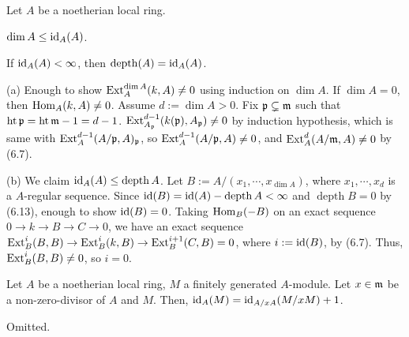 \documentclass{../../../small}
\newcommand{\depth}{\operatorname{depth}}
\newcommand{\hgt}{\operatorname{ht}}
\begin{document}
\begin{thm*}[6.12]
Let $A$ be a noetherian local ring.
\begin{parts}
\item $\dim A\le\operatorname{id}_A(A)$.
\item If $\operatorname{id}_A(A)<\infty$, then $\depth(A)=\id_A(A)$.
\end{parts}
\end{thm*}

\begin{pf}
(a)
Enough to show $\operatorname{Ext}_A^{\dim A}(k,A)\ne0$ using induction on $\dim A$.
If $\dim A=0$, then $\operatorname{Hom}_A(k,A)\ne0$.
Assume $d:=\dim A>0$.
Fix $\mathfrak{p}\subsetneq\mathfrak{m}$ such that $\hgt\fp=\hgt\fm-1=d-1$.
$\operatorname{Ext}_{A_{\mathfrak{p}}}^{d-1}(k(\mathfrak{p}),A_{\mathfrak{p}})\ne0$ by induction hypothesis, which is same with $\operatorname{Ext}_A^{d-1}(A/\mathfrak{p},A)_{\mathfrak{p}}$, so $\operatorname{Ext}_A^{d-1}(A/\mathfrak{p},A)\ne0$, and $\operatorname{Ext}_A^d(A/\mathfrak{m},A)\ne0$ by (6.7).


(b)
We claim $\id_A(A)\le\depth A$.
Let $B:=A/(x_1,\cdots,x_{\dim A})$, where $x_1,\cdots,x_d$ is a $A$-regular sequence.
Since $\id(B)=\id(A)-\depth A<\infty$ and $\depth B=0$ by (6.13), enough to show $\operatorname{id}(B)=0$.
Taking $\operatorname{Hom}_B(-B)$ on an exact sequence $0\to k\to B\to C\to0$, we have an exact sequence $\operatorname{Ext}_B^i(B,B)\to\operatorname{Ext}_B^i(k,B)\to\operatorname{Ext}_B^{i+1}(C,B)=0$, where $i:=\operatorname{id}(B)$, by (6.7).
Thus, $\operatorname{Ext}_B^i(B,B)\ne0$, so $i=0$.
\end{pf}

\begin{prop*}[6.13]
Let $A$ be a noetherian local ring, $M$ a finitely generated $A$-module.
Let $x\in\mathfrak{m}$ be a non-zero-divisor of $A$ and $M$.
Then, $\operatorname{id}_A(M)=\operatorname{id}_{A/xA}(M/xM)+1$.
\end{prop*}
\begin{pf}
Omitted.
\end{pf}
\end{document}

